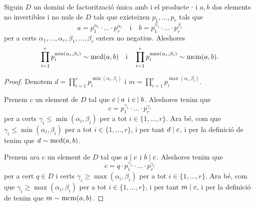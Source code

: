 \documentclass[../../Main.tex]{subfiles}
\begin{document}
	\begin{proposition}
		Siguin \(D\) un domini de factorització única amb i el producte \(\cdot\) i \(a,b\) dos elements no invertibles i no nuls de \(D\) tals que existeixen \(p_{1},\dots,p_{r}\) tals que
		\[a=p_{1}^{\alpha_{1}}\cdot\ldots\cdot p_{r}^{\alpha_{r}}\quad\text{i}\quad b=p_{1}^{\beta_{1}}\cdot\ldots\cdot p_{r}^{\beta_{r}}\]
		per a certs \(\alpha_{1},\dots,\alpha_{r},\beta_{1},\dots,\beta_{r}\) enters no negatius. Aleshores
		\[\prod_{i=1}^{r}p_{i}^{\min(\alpha_{i},\beta_{i})}\sim\operatorname{mcd}(a,b)\quad\text{i}\quad\prod_{i=1}^{r}p_{i}^{\max(\alpha_{i},\beta_{i})}\sim\operatorname{mcm}(a,b).\]
		\begin{proof}
			Denotem \(d=\prod_{i=1}^{r}p_{i}^{\min(\alpha_{i},\beta_{i})}\) i \(m=\prod_{i=1}^{r}p_{i}^{\max(\alpha_{i},\beta_{i})}\).
			
			Prenem \(c\) un element de \(D\) tal que \(c\mathrel{|} a\) i \(c\mathrel{|} b\). Aleshores tenim que
			\[c=p_{1}^{\gamma_{1}}\cdot\ldots\cdot p_{r}^{\gamma_{r}}\]
			per a certs \(\gamma_{i}\leq\min(\alpha_{i},\beta_{i})\) per a tot \(i\in\{1,\dots,r\}\). Ara bé, com que \(\gamma_{i}\leq\min(\alpha_{i},\beta_{i})\) per a tot \(i\in\{1,\dots,r\}\), i per tant \(d\mathrel{|} c\), i per la definició de  tenim que \(d\sim\operatorname{mcd}(a,b)\).
			
			Prenem ara \(c\) un element de \(D\) tal que \(a\mathrel{|} c\) i \(b\mathrel{|} c\). Aleshores tenim que
			\[c=q\cdot p_{1}^{\gamma_{1}}\cdot\ldots\cdot p_{r}^{\gamma_{r}}\]
			per a cert \(q\in D\) i certs \(\gamma_{i}\geq\max(\alpha_{i},\beta_{i})\) per a tot \(i\in\{1,\dots,r\}\). Ara bé, com que \(\gamma_{i}\geq\max(\alpha_{i},\beta_{i})\) per a tot \(i\in\{1,\dots,r\}\), i per tant \(m\mathrel{|} c\), i per la definició de  tenim que \(m\sim\operatorname{mcm}(a,b)\).
		\end{proof}
	\end{proposition}
\end{document}
